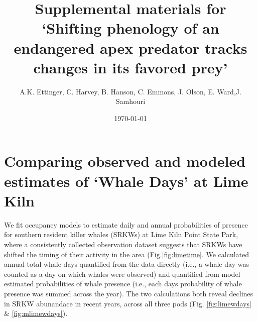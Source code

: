 \documentclass{article}
\begin{document}



\title{Supplemental materials for `Shifting phenology of an endangered apex predator tracks changes in its favored prey'}
\date{\today}
\maketitle
\author{A.K. Ettinger, C. Harvey, B. Hanson, C. Emmons, J. Olson, E. Ward,J. Samhouri}
\renewcommand{\thetable}{S\arabic{table}}
\renewcommand{\thefigure}{S\arabic{figure}}

\section* {Comparing observed and modeled estimates of `Whale Days' at Lime Kiln}
\par We fit occupancy models to estimate daily and annual probabilities of presence for southern resident killer whales (SRKWs) at Lime Kiln Point State Park, where a consistently collected observation dataset suggests that SRKWs have shifted the timing of their activity in the area (Fig.\ref{fig:limetime}. We calculated annual total whale days quantified from the data directly (i.e., a whale-day was counted as a day on which whales were observed) and quantified from model-estimated probabilities of whale presence (i.e., each days probability of whale presence was summed across the year). The two calculations both reveal declines in SRKW abunandace in recent years, across all three pods (Fig. \ref{fig:limewdays} \& \ref{fig:mlimewdays}).
\end{document}
